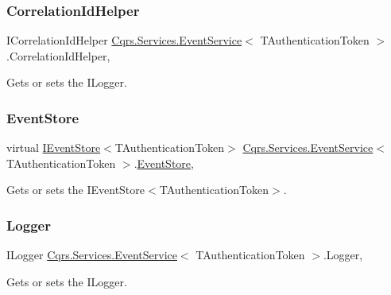 \subsubsection{\texorpdfstring{Correlation\+Id\+Helper}{CorrelationIdHelper}}
{\footnotesize\ttfamily I\+Correlation\+Id\+Helper \hyperlink{classCqrs_1_1Services_1_1EventService}{Cqrs.\+Services.\+Event\+Service}$<$ T\+Authentication\+Token $>$.Correlation\+Id\+Helper\hspace{0.3cm}{\ttfamily [get]}, {\ttfamily [protected]}}



Gets or sets the I\+Logger. 

\mbox{\label{classCqrs_1_1Services_1_1EventService_a07e516aae58050ab225f5ce5f1830ff6_a07e516aae58050ab225f5ce5f1830ff6}} 
\subsubsection{\texorpdfstring{Event\+Store}{EventStore}}
{\footnotesize\ttfamily virtual \hyperlink{interfaceCqrs_1_1Events_1_1IEventStore}{I\+Event\+Store}$<$T\+Authentication\+Token$>$ \hyperlink{classCqrs_1_1Services_1_1EventService}{Cqrs.\+Services.\+Event\+Service}$<$ T\+Authentication\+Token $>$.\hyperlink{classCqrs_1_1Events_1_1EventStore}{Event\+Store}\hspace{0.3cm}{\ttfamily [get]}, {\ttfamily [protected]}}



Gets or sets the I\+Event\+Store$<$\+T\+Authentication\+Token$>$. 

\mbox{\label{classCqrs_1_1Services_1_1EventService_acd30fea6829b27ee802126c36f8875b4_acd30fea6829b27ee802126c36f8875b4}} 
\subsubsection{\texorpdfstring{Logger}{Logger}}
{\footnotesize\ttfamily I\+Logger \hyperlink{classCqrs_1_1Services_1_1EventService}{Cqrs.\+Services.\+Event\+Service}$<$ T\+Authentication\+Token $>$.Logger\hspace{0.3cm}{\ttfamily [get]}, {\ttfamily [protected]}}



Gets or sets the I\+Logger. 

